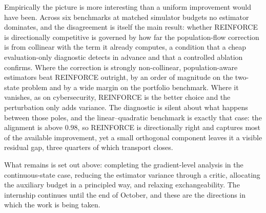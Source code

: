 Empirically the picture is more interesting than a uniform improvement would have been. Across six benchmarks at matched simulator budgets no estimator dominates, and the disagreement is itself the main result: whether REINFORCE is directionally competitive is governed by how far the population-flow correction is from collinear with the term it already computes, a condition that a cheap evaluation-only diagnostic detects in advance and that a controlled ablation confirms. Where the correction is strongly non-collinear, population-aware estimators beat REINFORCE outright, by an order of magnitude on the two-state problem and by a wide margin on the portfolio benchmark. Where it vanishes, as on cybersecurity, REINFORCE is the better choice and the perturbation only adds variance. The diagnostic is silent about what happens between those poles, and the linear--quadratic benchmark is exactly that case: the alignment is above $0.98$, so REINFORCE is directionally right and captures most of the available improvement, yet a small orthogonal component leaves it a visible residual gap, three quarters of which transport closes.

What remains is set out above: completing the gradient-level analysis in the continuous-state case, reducing the estimator variance through a critic, allocating the auxiliary budget in a principled way, and relaxing exchangeability. The internship continues until the end of October, and these are the directions in which the work is being taken.
